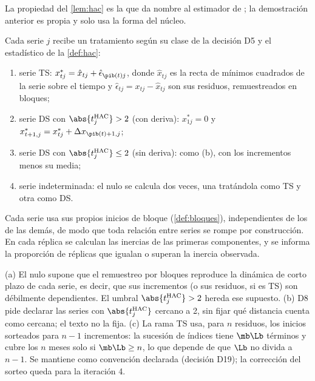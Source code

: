 La propiedad del \cref{lem:hac} es la que da nombre al estimador de \textcite{newey_west_1987}; la
demostración anterior es propia y solo usa la forma del núcleo.

\begin{definicion}\label{def:nulo-mixto}
Cada serie $j$ recibe un tratamiento según su clase de la decisión D5 y el estadístico de la
\cref{def:hac}:
\begin{enumerate}[label=(\alph*)]
  \item serie TS: $x^\ast_{tj}=\hat x_{tj}+\hat\epsilon_{\pib(t)j}$, donde $\hat x_{tj}$ es la recta
    de mínimos cuadrados de la serie sobre el tiempo y $\hat\epsilon_{tj}=x_{tj}-\hat x_{tj}$ son sus
    residuos, remuestreados en bloques;
  \item serie DS con $\abs{t^{\mathrm{HAC}}_j}>2$ (con deriva): $x^\ast_{1j}=0$ y
    $x^\ast_{t+1,j}=x^\ast_{tj}+\Delta x_{\pib(t)+1,j}$;
  \item serie DS con $\abs{t^{\mathrm{HAC}}_j}\le2$ (sin deriva): como (b), con los incrementos menos
    su media;
  \item serie indeterminada: el nulo se calcula dos veces, una tratándola como TS y otra como DS.
\end{enumerate}
Cada serie usa sus propios inicios de bloque (\cref{def:bloques}), independientes de los de las
demás, de modo que toda relación entre series se rompe por construcción. En cada réplica se
calculan las inercias de las primeras componentes, y se informa la proporción de réplicas que
igualan o superan la inercia observada.
\end{definicion}

\begin{observacion}\label{obs:nulo-mixto}
(a) El nulo supone que el remuestreo por bloques reproduce la dinámica de corto plazo de cada
serie, es decir, que sus incrementos (o sus residuos, si es TS) son débilmente dependientes. El
umbral $\abs{t^{\mathrm{HAC}}_j}>2$ hereda ese supuesto. (b) D8 pide declarar las series con
$\abs{t^{\mathrm{HAC}}_j}$ cercano a 2, sin fijar qué distancia cuenta como cercana; el texto no la
fija. (c) La rama TS usa, para $n$ residuos, los inicios sorteados para $n-1$ incrementos: la
sucesión de índices tiene $\mb\Lb$ términos y cubre los $n$ meses solo si $\mb\Lb\ge n$, lo que
depende de que $\Lb$ no divida a $n-1$. Se mantiene como convención declarada (decisión D19); la
corrección del sorteo queda para la iteración 4.
\end{observacion}

